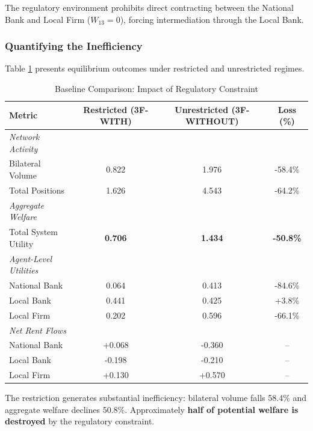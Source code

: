\documentclass[12pt]{article}
\begin{document}
The regulatory environment prohibits direct contracting between the National Bank and Local Firm ($W_{13} = 0$), forcing intermediation through the Local Bank.

\subsubsection{Quantifying the Inefficiency}

Table \ref{tab:baseline_comparison} presents equilibrium outcomes under restricted and unrestricted regimes.

\begin{table}[h]
\centering
\caption{Baseline Comparison: Impact of Regulatory Constraint}
\label{tab:baseline_comparison}
\begin{tabular}{lccc}
\toprule
\textbf{Metric} & \textbf{Restricted (3F-WITH)} & \textbf{Unrestricted (3F-WITHOUT)} & \textbf{Loss (\%)} \\
\midrule
\textit{Network Activity} & & & \\
\quad Bilateral Volume & 0.822 & 1.976 & -58.4\% \\
\quad Total Positions & 1.626 & 4.543 & -64.2\% \\
\midrule
\textit{Aggregate Welfare} & & & \\
\quad Total System Utility & \textbf{0.706} & \textbf{1.434} & \textbf{-50.8\%} \\
\midrule
\textit{Agent-Level Utilities} & & & \\
\quad National Bank & 0.064 & 0.413 & -84.6\% \\
\quad Local Bank & 0.441 & 0.425 & +3.8\% \\
\quad Local Firm & 0.202 & 0.596 & -66.1\% \\
\midrule
\textit{Net Rent Flows} & & & \\
\quad National Bank & +0.068 & -0.360 & -- \\
\quad Local Bank & -0.198 & -0.210 & -- \\
\quad Local Firm & +0.130 & +0.570 & -- \\
\bottomrule
\end{tabular}
\end{table}

The restriction generates substantial inefficiency: bilateral volume falls 58.4\% and aggregate welfare declines 50.8\%. Approximately \textbf{half of potential welfare is destroyed} by the regulatory constraint.
\end{document}
